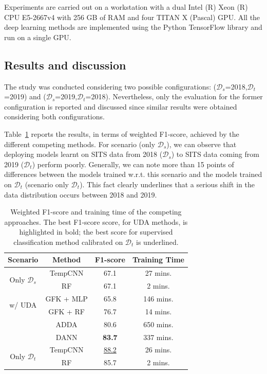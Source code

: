 Experiments are carried out on a workstation with a dual Intel (R) Xeon (R) CPU E5-2667v4 with 256 GB of RAM and four TITAN X (Pascal) GPU. All the deep learning methods are implemented using the Python TensorFlow library and run on a single GPU.%

\subsection{Results and discussion}
\label{ssec:results-discussion}
The study was conducted considering two possible configurations: ($\mathcal{D}_s$=2018,$\mathcal{D}_t$=2019) and ($\mathcal{D}_s$=2019,$\mathcal{D}_t$=2018). Nevertheless, only the evaluation for the former configuration is reported and discussed since similar results were obtained considering both configurations.

Table~\ref{tab:uda_methods} reports the results, in terms of weighted F1-score, achieved by the different competing methods. For scenario (only $\mathcal{D}_s$), we can observe that deploying models learnt on  SITS data from 2018 ($\mathcal{D}_s$) to SITS data coming from 2019 ($\mathcal{D}_t$) perform poorly. Generally, we can note more than 15 points of differences between the models trained w.r.t. this scenario and the models trained on $\mathcal{D}_t$ (scenario only $\mathcal{D}_t$). This fact clearly underlines that a serious shift in the data distribution occurs between 2018 and 2019. 

\begin{table}[!htb]
\centering
\small
\begin{tabular}{|c|c|c|c|} \hline
\textbf{Scenario} & \textbf{Method} & \textbf{F1-score} & \textbf{Training Time } \\  \hline
\multirow{2}{*}{Only $\mathcal{D}_s$} & TempCNN & 67.1 & 27 mins.\\ \cline{2-4}
                                      & RF & 67.1 & 2 mins.\\ \hline \hline
\multirow{2}{*}{w/ UDA}  & GFK + MLP & 65.8 & 146 mins.\\ \cline{2-4}
 & GFK + RF & 76.7 & 14 mins.\\ \cline{2-4}
    & ADDA & 80.6 & 650 mins.\\ \cline{2-4}
    & DANN & \textbf{83.7} & 337 mins.\\ \hline \hline
\multirow{2}{*}{Only $\mathcal{D}_t$} & TempCNN & \underline{88.2} & 26 mins.\\ \cline{2-4}
                    & RF & 85.7 & 2 mins.\\ \hline 
\end{tabular}
\caption{Weighted F1-score and training time of the competing approaches. The best F1-score score, for UDA methods, is highlighted in bold; the best score for supervised classification method calibrated on $\mathcal{D}_t$ is underlined. %
\label{tab:uda_methods}}
\end{table}

